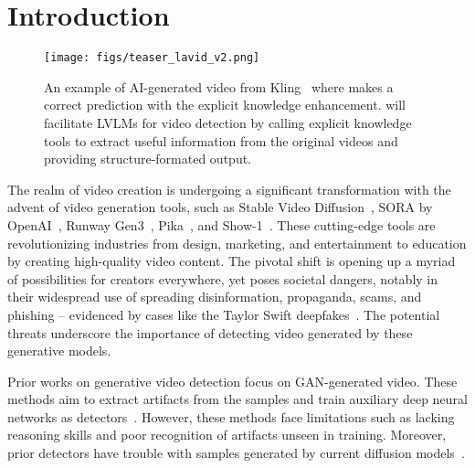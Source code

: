 \section{Introduction}


\begin{figure}[t!]
    \centering
    \texttt{[image: figs/teaser\_lavid\_v2.png]}
    \caption{An example of AI-generated video from Kling~\cite{klingai} where \lavid makes a correct prediction with the explicit knowledge enhancement. \lavid will facilitate LVLMs for video detection by calling explicit knowledge tools to extract useful information from the original videos and providing structure-formated output.}
    \label{fig:main_flow}
\end{figure}


\label{sec:intro}
The realm of video creation is undergoing a significant transformation with the advent of video generation tools, such as Stable Video Diffusion~\cite{blattmann2023stable}, SORA by OpenAI~\cite{videoworldsimulators2024}, Runway Gen3~\cite{runway3}, Pika~\cite{pika}, and Show-1~\cite{zhang2023show}. These cutting-edge tools are revolutionizing industries from design, marketing, and entertainment to education by creating high-quality video content. The pivotal shift is opening up a myriad of possibilities for creators everywhere, yet poses societal dangers, notably in their widespread use of spreading disinformation, propaganda, scams, and phishing -- evidenced by cases like the Taylor Swift deepfakes~\cite{taylorswift}. The potential threats underscore the importance of detecting video generated by these generative models.

Prior works on generative video detection focus on GAN-generated video. These methods aim to extract artifacts from the samples and train auxiliary deep neural networks as detectors~\cite{chang2024matters}. However, these methods face limitations such as lacking reasoning skills and poor recognition of artifacts unseen in training. Moreover, prior detectors have trouble with samples generated by current diffusion models~\cite{wang2019cnngenerated, patchforeccv20}.

